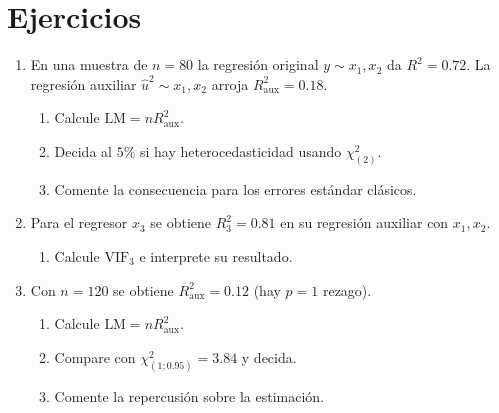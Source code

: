 \documentclass[10pt,a4paper]{article}
\begin{document}
\section{Ejercicios}

\begin{enumerate}
    \item En una muestra de $n=80$ la regresión original $y\sim x_1,x_2$ da
$R^{2}=0.72$.  
La regresión auxiliar $\hat u^{2}\sim x_1,x_2$ arroja 
$R^{2}_{\text{aux}}=0.18$.

\begin{enumerate}
\item Calcule $\text{LM}=nR^{2}_{\text{aux}}$.
\item Decida al $5\%$ si hay heterocedasticidad 
      usando $\chi^{2}_{(2)}$.
\item Comente la consecuencia para los errores estándar clásicos.
\end{enumerate}

\item 
Para el regresor $x_3$ se obtiene $R^{2}_{3}=0.81$
en su regresión auxiliar con $x_1,x_2$.

\begin{enumerate}
\item Calcule $\mathrm{VIF}_3$ e interprete su resultado.

\end{enumerate}

\item Con $n=120$ se obtiene $R^{2}_{\text{aux}}=0.12$
(hay $p=1$ rezago).

\begin{enumerate}
\item Calcule $\text{LM}=nR^{2}_{\text{aux}}$.
\item Compare con $\chi^{2}_{(1;0.95)}=3.84$ y decida.
\item Comente la repercusión sobre la estimación.
\end{enumerate}

\end{enumerate}

    
\end{document}

